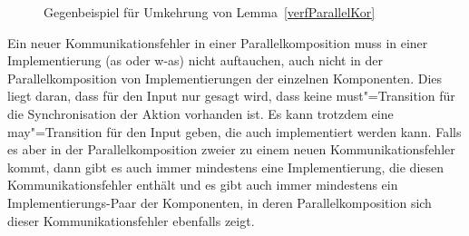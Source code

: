 \begin{figure}[htbp]
  \begin{center}
    \caption{Gegenbeispiel für Umkehrung von Lemma~\ref{verfParallelKor}}
    \label{impParallelFig}
  \end{center}
\end{figure}

Ein neuer Kommunikationsfehler in einer Parallelkomposition muss in einer
Implementierung (as oder w-as) nicht auftauchen, auch nicht in der
Parallelkomposition von Implementierungen der einzelnen Komponenten. Dies liegt
daran, dass für den Input nur gesagt wird, dass keine must"=Transition für die
Synchronisation der Aktion vorhanden ist. Es kann trotzdem eine
may"=Transition für den Input geben, die auch implementiert werden kann.
Falls es aber in der Parallelkomposition zweier \MEIO{} zu einem neuen
Kommunikationsfehler kommt, dann gibt es auch immer mindestens eine
Implementierung, die diesen Kommunikationsfehler enthält und es gibt auch immer
mindestens ein Implementierungs-Paar der Komponenten, in deren
Parallelkomposition sich dieser Kommunikationsfehler ebenfalls zeigt.
